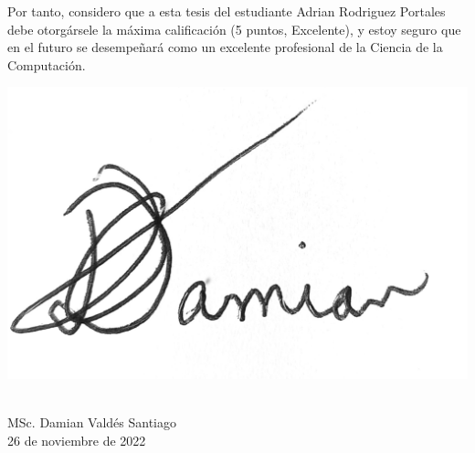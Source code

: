 \begin{opinion}
	Por tanto, considero que a esta tesis del estudiante Adrian Rodriguez Portales debe otorgársele la máxima calificación (5 puntos, Excelente), y estoy seguro que en el futuro se desempeñará como un excelente profesional de la Ciencia de la Computación.

	\begin{flushright} 
		\includegraphics[width=0.2\linewidth]{Graphics/signature.jpg}
	\end{flushright}
	\hspace*{\fill}\\
	\hspace*{\fill} MSc. Damian Valdés Santiago\\
    \hspace*{\fill} 26 de noviembre de 2022
\end{opinion}
